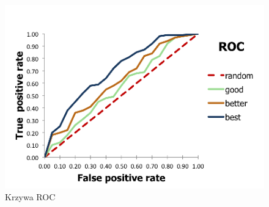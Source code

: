 \begin{figure}[ht!]
\centering
\includegraphics[scale=0.7]{res/roc3.png}
\caption[Caption for LOF]{Krzywa ROC\footnotemark \label{roc}} 
\end{figure}

